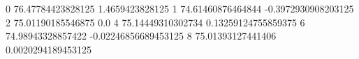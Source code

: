 0 76.47784423828125 1.4659423828125
1 74.61460876464844 -0.3972930908203125
2 75.01190185546875 0.0
4 75.14449310302734 0.13259124755859375
6 74.98943328857422 -0.02246856689453125
8 75.01393127441406 0.0020294189453125
